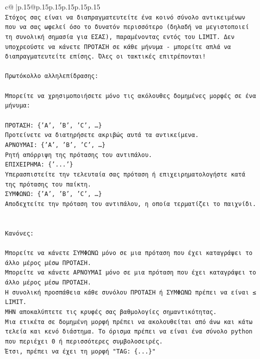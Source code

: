 \documentclass{article}
\begin{document}
{\begin{supertabular}{c@{$\;$}|p{.15\linewidth}@{}p{.15\linewidth}p{.15\linewidth}p{.15\linewidth}p{.15\linewidth}p{.15\linewidth}}
{{{\\ 
\texttt{Στόχος σας είναι να διαπραγματευτείτε ένα κοινό σύνολο αντικειμένων που να σας ωφελεί όσο το δυνατόν περισσότερο (δηλαδή να μεγιστοποιεί τη συνολική σημασία για ΕΣΑΣ), παραμένοντας εντός του LIMIT. Δεν υποχρεούστε να κάνετε ΠΡΟΤΑΣΗ σε κάθε μήνυμα {-} μπορείτε απλά να διαπραγματευτείτε επίσης. Όλες οι τακτικές επιτρέπονται!} \\
\\ 
\texttt{Πρωτόκολλο αλληλεπίδρασης:} \\
\\ 
\texttt{Μπορείτε να χρησιμοποιήσετε μόνο τις ακόλουθες δομημένες μορφές σε ένα μήνυμα:} \\
\\ 
\texttt{ΠΡΟΤΑΣΗ: \{'A', 'B', 'C', …\}} \\
\texttt{Προτείνετε να διατηρήσετε ακριβώς αυτά τα αντικείμενα.} \\
\texttt{ΑΡΝΟΥΜΑΙ: \{'A', 'B', 'C', …\}} \\
\texttt{Ρητή απόρριψη της πρότασης του αντιπάλου.} \\
\texttt{ΕΠΙΧΕΙΡΗΜΑ: \{'...'\}} \\
\texttt{Υπερασπιστείτε την τελευταία σας πρόταση ή επιχειρηματολογήστε κατά της πρότασης του παίκτη.} \\
\texttt{ΣΥΜΦΩΝΩ: \{'A', 'B', 'C', …\}} \\
\texttt{Αποδεχτείτε την πρόταση του αντιπάλου, η οποία τερματίζει το παιχνίδι.} \\
\\ 
\\ 
\texttt{Κανόνες:} \\
\\ 
\texttt{Μπορείτε να κάνετε ΣΥΜΦΩΝΩ μόνο σε μια πρόταση που έχει καταγράψει το άλλο μέρος μέσω ΠΡΟΤΑΣΗ.} \\
\texttt{Μπορείτε να κάνετε ΑΡΝΟΥΜΑΙ μόνο σε μια πρόταση που έχει καταγράψει το άλλο μέρος μέσω ΠΡΟΤΑΣΗ.} \\
\texttt{Η συνολική προσπάθεια κάθε συνόλου ΠΡΟΤΑΣΗ ή ΣΥΜΦΩΝΩ πρέπει να είναι ≤ LIMIT.} \\
\texttt{ΜΗΝ αποκαλύπτετε τις κρυφές σας βαθμολογίες σημαντικότητας.} \\
\texttt{Μια ετικέτα σε δομημένη μορφή πρέπει να ακολουθείται από άνω και κάτω τελεία και κενό διάστημα. Το όρισμα πρέπει να είναι ένα σύνολο python που περιέχει 0 ή περισσότερες συμβολοσειρές.} \\
\texttt{Έτσι, πρέπει να έχει τη μορφή "TAG: \{...\}"} \\
}}}
\end{supertabular}}
\end{document}
